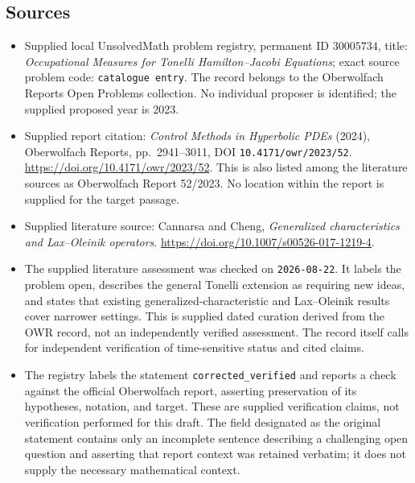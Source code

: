 \documentclass[11pt]{article}
\begin{document}
\subsection{Sources}
\begin{itemize}
\item Supplied local UnsolvedMath problem registry, permanent ID \(30005734\), title: \emph{Occupational Measures for Tonelli Hamilton--Jacobi Equations}; exact source problem code: \texttt{catalogue entry}. The record belongs to the Oberwolfach Reports Open Problems collection. No individual proposer is identified; the supplied proposed year is 2023.
\item Supplied report citation: \emph{Control Methods in Hyperbolic PDEs} (2024), Oberwolfach Reports, pp.\ 2941--3011, DOI \texttt{10.4171/owr/2023/52}. \url{https://doi.org/10.4171/owr/2023/52}. This is also listed among the literature sources as Oberwolfach Report 52/2023. No location within the report is supplied for the target passage.
\item Supplied literature source: Cannarsa and Cheng, \emph{Generalized characteristics and Lax--Oleinik operators}. \url{https://doi.org/10.1007/s00526-017-1219-4}.
\item The supplied literature assessment was checked on \texttt{2026-08-22}. It labels the problem open, describes the general Tonelli extension as requiring new ideas, and states that existing generalized-characteristic and Lax--Oleinik results cover narrower settings. This is supplied dated curation derived from the OWR record, not an independently verified assessment. The record itself calls for independent verification of time-sensitive status and cited claims.
\item The registry labels the statement \texttt{corrected\_verified} and reports a check against the official Oberwolfach report, asserting preservation of its hypotheses, notation, and target. These are supplied verification claims, not verification performed for this draft. The field designated as the original statement contains only an incomplete sentence describing a challenging open question and asserting that report context was retained verbatim; it does not supply the necessary mathematical context.
\end{itemize}
\end{document}

